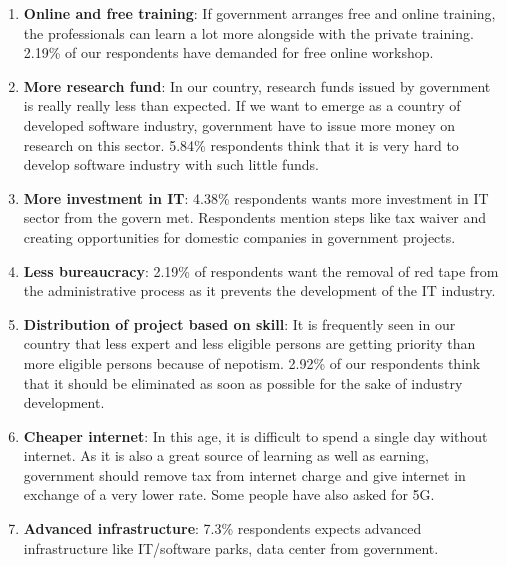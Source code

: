 \begin{enumerate}
    \item \textbf{Online and free training}: If government arranges free and online training, the professionals can learn a lot more alongside with the private training. 2.19\% of our respondents have demanded for free online workshop.
    
    \item\textbf{More research fund}: In our country, research funds issued by government is really really less than expected. If we want to emerge as a country of developed software industry, government have to issue more money on research on this sector. 5.84\% respondents think that it is very hard to develop software industry with such little funds.
    
    \item\textbf{More investment in IT}: 4.38\% respondents wants more investment  in IT sector from the govern met. Respondents mention steps like tax waiver and creating opportunities for domestic companies in government projects.
    
    \item\textbf{Less bureaucracy}: 2.19\% of respondents want the removal of red tape from the administrative process as it prevents the development of the IT industry.
    
    \item\textbf{Distribution of project based on skill}: It is frequently seen in our country that less expert and less eligible persons are getting priority than more eligible persons because of nepotism. 2.92\% of our respondents think that it should be eliminated as soon as possible for the sake of industry development.
    
    \item\textbf{Cheaper internet}: In this age, it is difficult to spend a single day without internet. As it is also a great source of learning as well as earning, government should remove tax from internet charge and give internet in exchange of a very lower rate. Some people have also asked for 5G.
    
    \item\textbf{Advanced infrastructure}: 7.3\% respondents expects advanced infrastructure like IT/software parks, data center from government.
    
\end{enumerate}

